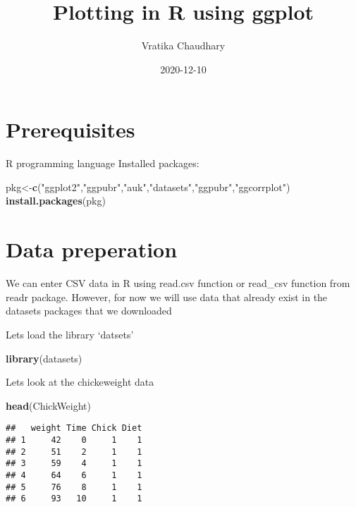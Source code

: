 \documentclass[
]{book}
\title{Plotting in R using ggplot}
\author{Vratika Chaudhary}
\date{2020-12-10}
\newenvironment{Shaded}{\begin{snugshade}}{\end{snugshade}}
\newcommand{\KeywordTok}[1]{\textcolor[rgb]{0.13,0.29,0.53}{\textbf{#1}}}
\newcommand{\NormalTok}[1]{#1}
\newcommand{\StringTok}[1]{\textcolor[rgb]{0.31,0.60,0.02}{#1}}
\begin{document}
\maketitle

{
\setcounter{tocdepth}{1}
\tableofcontents
}
\hypertarget{prerequisites}{%
\chapter{Prerequisites}\label{prerequisites}}

R programming language
Installed packages:

\begin{Shaded}
\begin{Highlighting}[]
\NormalTok{pkg<-}\KeywordTok{c}\NormalTok{(}\StringTok{"ggplot2"}\NormalTok{,}\StringTok{"ggpubr"}\NormalTok{,}\StringTok{"auk"}\NormalTok{,}\StringTok{"datasets"}\NormalTok{,}\StringTok{"ggpubr"}\NormalTok{,}\StringTok{"ggcorrplot"}\NormalTok{)}
\KeywordTok{install.packages}\NormalTok{(pkg)}
\end{Highlighting}
\end{Shaded}

\hypertarget{intro}{%
\chapter{Data preperation}\label{intro}}

We can enter CSV data in R using read.csv function or read\_csv function from readr package. However, for now we will use data that already exist in the datasets packages that we downloaded

Lets load the library `datsets'

\begin{Shaded}
\begin{Highlighting}[]
\KeywordTok{library}\NormalTok{(datasets)}
\end{Highlighting}
\end{Shaded}

Lets look at the chickeweight data

\begin{Shaded}
\begin{Highlighting}[]
\KeywordTok{head}\NormalTok{(ChickWeight)}
\end{Highlighting}
\end{Shaded}

\begin{verbatim}
##   weight Time Chick Diet
## 1     42    0     1    1
## 2     51    2     1    1
## 3     59    4     1    1
## 4     64    6     1    1
## 5     76    8     1    1
## 6     93   10     1    1
\end{verbatim}
\end{document}
